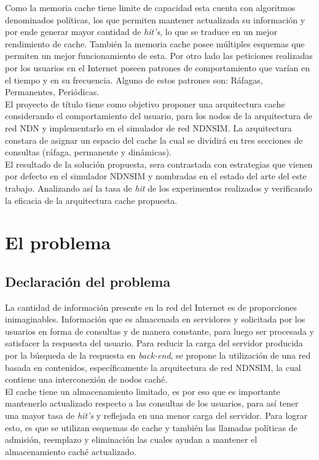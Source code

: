 \documentclass[12pt]{ociamthesis}  %
\begin{document}
Como la memoria cache tiene limite de capacidad esta cuenta con algoritmos denominados políticas, los que permiten mantener actualizada su información y por ende generar mayor cantidad de \textit{hit's}, lo que se traduce en un mejor rendimiento de cache. También la memoria cache posee múltiples esquemas que permiten un mejor funcionamiento de esta. Por otro lado las peticiones realizadas por los usuarios en el Internet poseen patrones de comportamiento que varían en el tiempo y en su frecuencia. Alguno de estos patrones son: Ráfagas, Permanentes, Periódicas.\\

El proyecto de título tiene como objetivo proponer una arquitectura cache considerando el comportamiento del usuario, para los nodos de la arquitectura de red NDN  y implementarlo en el simulador de red NDNSIM. La arquitectura constara de asignar un espacio del cache la cual se dividirá en tres secciones de consultas (ráfaga, permanente y dinámicas).\\

El resultado de la solución propuesta, sera contrastada con estrategias que vienen por defecto en el simulador NDNSIM y nombradas en el estado del arte del este trabajo. Analizando así la tasa de \textit{hit} de los experimentos realizados y verificando la eficacia de la arquitectura cache propuesta.\\

\section{El problema}

\subsection{Declaración del problema}
La cantidad de información presente en la red del Internet es de proporciones inimaginables. Información que es almacenada en servidores y solicitada por los usuarios en forma de consultas y de manera constante, para luego ser procesada y satisfacer la respuesta del usuario. Para reducir la carga del servidor producida por la búsqueda de la respuesta en \textit{back-end}, se propone la utilización de una red basada en contenidos, específicamente la arquitectura de red NDNSIM, la cual contiene una interconexión de nodos caché.\\

El cache tiene un almacenamiento limitado, es por eso que es importante mantenerlo actualizado respecto a las consultas de los usuarios, para así tener una mayor tasa de \textit{hit's} y reflejada en una menor carga del servidor. Para lograr esto, es que se utilizan esquemas de cache y también las llamadas políticas de admisión, reemplazo y eliminación las cuales ayudan a mantener el almacenamiento caché actualizado.\\
\end{document}
